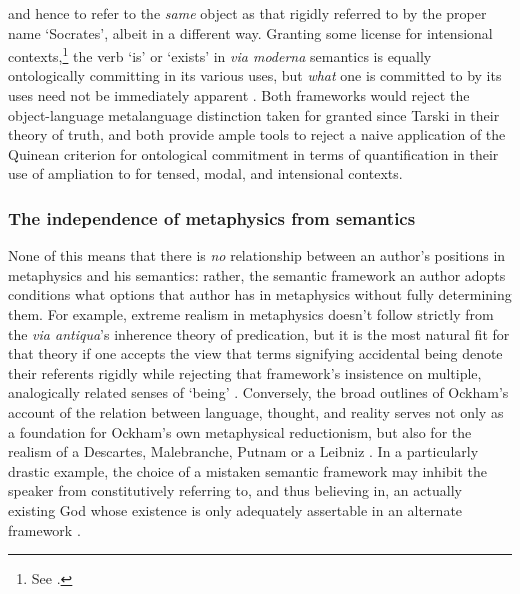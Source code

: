 \documentclass[]{article}
\begin{document}
and hence to refer to the \emph{same} object as that rigidly referred to by the proper name `Socrates', 
albeit in a different way. 
Granting some license for intensional contexts,\footnote{See \autocite{Klima2005}.} 
the verb `is' or `exists' in \emph{via moderna} semantics is equally ontologically committing in its various uses, 
but \emph{what} one is committed to by its uses need not be immediately apparent \autocite[437-430]{Klima2008a}.
Both frameworks would reject the object-language metalanguage distinction taken for granted since Tarski in their theory of truth,
and both provide ample tools to reject a naive application of the Quinean criterion for ontological commitment in terms of quantification in their use of ampliation to for tensed, modal, and intensional contexts.

\subsubsection{The independence of metaphysics from semantics}
None of this means that there is \emph{no} relationship between an author's positions in metaphysics and his semantics: 
rather, the semantic framework an author adopts conditions what options that author has in metaphysics without fully determining them. 
For example, extreme realism in metaphysics doesn't follow strictly from the \emph{via antiqua}'s inherence theory of predication, 
but it is the most natural fit for that theory 
if one accepts the view that terms signifying accidental being denote their referents rigidly 
while rejecting that framework's insistence on multiple, analogically related senses of `being' \autocite{Klima1999}. 
Conversely, the broad outlines of Ockham's account of the relation between language, thought, and reality 
serves not only as a foundation for Ockham's own metaphysical reductionism, 
but also for the realism of a Descartes, Malebranche, Putnam or a Leibniz \autocite{Klima1991}. 
In a particularly drastic example, the choice of a mistaken semantic framework may inhibit the speaker from constitutively referring to, 
and thus believing in, 
an actually existing God whose existence is only adequately assertable in an alternate framework \autocite[74]{Klima2008b}. %
\end{document}
